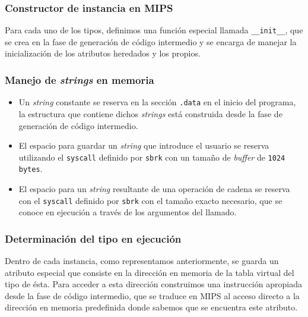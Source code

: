 \documentclass[a4paper,10pt,twocolumn]{article}
\begin{document}
\subsubsection{Constructor de instancia en MIPS}

Para cada uno de los tipos, definimos una función especial llamada \lstinline|__init__|, que se crea en la fase de generación de código intermedio y se encarga de manejar la inicialización de los atributos heredados y los propios. 

\subsubsection{Manejo de \textit{strings} en memoria}

\begin{itemize}
	\item Un \textit{string} constante se reserva en la sección \lstinline|.data| en el inicio del programa, la estructura que contiene dichos \textit{strings} está construida desde la fase de generación de código intermedio.
	\item El espacio para guardar un \textit{string} que introduce el usuario se reserva utilizando el \lstinline|syscall| definido por \lstinline|sbrk| con un tamaño de \textit{buffer} de \lstinline|1024 bytes|. 
	\item El espacio para un \textit{string} resultante de una operación de cadena se reserva con el \lstinline|syscall| definido por \lstinline|sbrk| con el tamaño exacto necesario, que se conoce en ejecución a través de los argumentos del llamado.  
\end{itemize}

\subsubsection{Determinación del tipo en ejecución}

Dentro de cada instancia, como representamos anteriormente, se guarda un atributo especial que consiste en la dirección en memoria de la tabla virtual del tipo de ésta. Para acceder a esta dirección construimos una instrucción apropiada desde la fase de código intermedio, que se traduce en MIPS al acceso directo a la dirección en memoria predefinida donde sabemos que se encuentra este atributo. 


\label{end}
\end{document}
